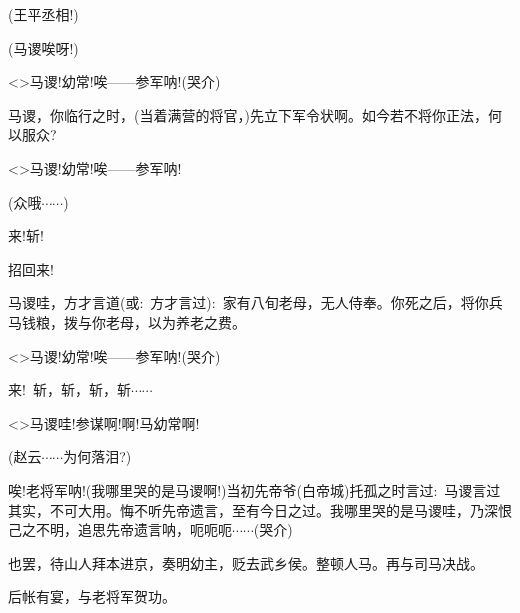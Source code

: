 {(王平\hspace{30pt}丞相!)




(马谡\hspace{30pt}唉呀!)





\textless{}\!\textgreater{}马谡!幼常!唉------参军呐!({\hwfs 哭介})

马谡，你临行之时，(当着满营的将官，)先立下军令状啊。如今若不将你正法，何以服众?

\textless{}\!\textgreater{}马谡!幼常!唉------参军呐!

(众\hspace{40pt}哦$\cdots{}\cdots{}$)

来!斩!

招回来!

马谡哇，方才言道({\akai 或}:~方才言过):~家有八旬老母，无人侍奉。你死之后，将你兵马钱粮，拨与你老母，以为养老之费。

\textless{}\!\textgreater{}马谡!幼常!唉------参军呐!({\hwfs 哭介})

来!~斩，斩，斩，斩$\cdots{}\cdots{}$


\textless{}\!\textgreater{}马谡哇!参谋啊!啊!马幼常啊!

(赵云\hspace{30pt}$\cdots{}\cdots{}$为何落泪?)

唉!老将军呐!(我哪里哭的是马谡啊!)当初先帝爷(白帝城)托孤之时言过:~马谡言过其实，不可大用。悔不听先帝遗言，至有今日之过。我哪里哭的是马谡哇，乃深恨己之不明，追思先帝遗言呐，呃呃呃$\cdots{}\cdots{}$({\hwfs 哭介})

也罢，待山人拜本进京，奏明幼主，贬去武乡侯。整顿人马。再与司马决战。

后帐有宴，与老将军贺功。

}
